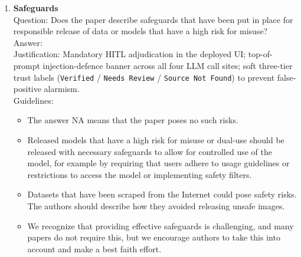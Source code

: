 \documentclass{article}
\begin{document}
\begin{enumerate}
\item {\bf Safeguards}\\
Question: Does the paper describe safeguards that have been put in place for responsible release of data or models that have a high risk for misuse?\\
Answer: \answerYes{}\\
Justification: Mandatory HITL adjudication in the deployed UI; top-of-prompt injection-defence banner across all four LLM call sites; soft three-tier trust labels (\texttt{Verified} / \texttt{Needs Review} / \texttt{Source Not Found}) to prevent false-positive alarmism.\\
Guidelines:
\begin{itemize}
\item The answer NA means that the paper poses no such risks.
\item Released models that have a high risk for misuse or dual-use should be released with necessary safeguards to allow for controlled use of the model, for example by requiring that users adhere to usage guidelines or restrictions to access the model or implementing safety filters.
\item Datasets that have been scraped from the Internet could pose safety risks. The authors should describe how they avoided releasing unsafe images.
\item We recognize that providing effective safeguards is challenging, and many papers do not require this, but we encourage authors to take this into account and make a best faith effort.
\end{itemize}


\end{enumerate}
\end{document}
